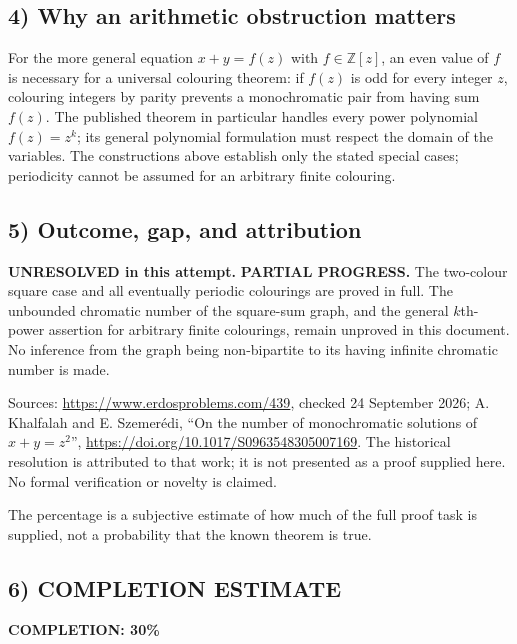\subsection*{4) Why an arithmetic obstruction matters}
For the more general equation $x+y=f(z)$ with $f\in\mathbb Z[z]$, an even value of $f$ is necessary for a universal colouring theorem: if $f(z)$ is odd for every integer $z$, colouring integers by parity prevents a monochromatic pair from having sum $f(z)$. The published theorem in particular handles every power polynomial $f(z)=z^k$; its general polynomial formulation must respect the domain of the variables. The constructions above establish only the stated special cases; periodicity cannot be assumed for an arbitrary finite colouring.

\subsection*{5) Outcome, gap, and attribution}
\textbf{UNRESOLVED in this attempt.} \textbf{PARTIAL PROGRESS.} The two-colour square case and all eventually periodic colourings are proved in full. The unbounded chromatic number of the square-sum graph, and the general $k$th-power assertion for arbitrary finite colourings, remain unproved in this document. No inference from the graph being non-bipartite to its having infinite chromatic number is made.

Sources: \url{https://www.erdosproblems.com/439}, checked 24 September 2026; A. Khalfalah and E. Szemer\'edi, ``On the number of monochromatic solutions of $x+y=z^2$'', \url{https://doi.org/10.1017/S0963548305007169}. The historical resolution is attributed to that work; it is not presented as a proof supplied here. No formal verification or novelty is claimed.

The percentage is a subjective estimate of how much of the full proof task is supplied, not a probability that the known theorem is true.
\subsection*{6) COMPLETION ESTIMATE}
\textbf{COMPLETION: 30\%}
